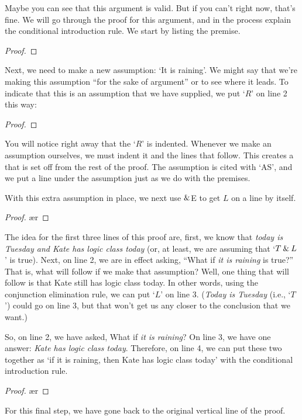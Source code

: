 Maybe you can see that this argument is valid. But if you can't right now, that's fine. We will go through the proof for this argument, and in the process explain the conditional introduction rule. We start by listing the premise.
	\begin{proof}
		 \pr{}
	\end{proof}
Next, we need to make a new assumption: `It is raining'. We might say that we're making this assumption ``for the sake of argument'' or to see where it leads. To indicate that this is an assumption that we have supplied, we put `$R$' on line 2 this way:
	\begin{proof}
		 \pr{}
		\open
			 \as{}
	\end{proof}
You will notice right away that the `$R$' is indented. Whenever we make an assumption ourselves, we must indent it and the lines that follow. This creates a  that is set off from the rest of the proof. The assumption is cited with `AS', and we put a line under the assumption just as we do with the premises.

With this extra assumption in place, we next use $\mathbin{\&}$E to get $L$ on a line by itself.
	\begin{proof}
		 \pr{}
		\open
			 \as{}
			\ae{r}
	\end{proof}
The idea for the first three lines of this proof are, first, we know that \textit{today is Tuesday and Kate has logic class today} (or, at least, we are assuming that `$ T \mathbin{\&} L$' is true). Next, on line 2, we are in effect asking, ``What if \textit{it is raining} is true?'' That is, what will follow if we make that assumption? Well, one thing that will follow is that Kate still has logic class today. 
In other words, using the conjunction elimination rule, we can put `$L$' on line 3. (\textit{Today is Tuesday} (i.e., `$T$') could go on line 3, but that won't get us any closer to the conclusion that we want.)

So, on line 2, we have asked, What if \textit{it is raining}? On line 3, we have one answer: \textit{Kate has logic class today}. Therefore, on line 4, we can put these two together as `if it is raining, then Kate has logic class today' with the conditional introduction rule.
	\begin{proof}
		 \pr{}
		\open
			 \as{}
			\ae{r}
			\close
	\end{proof}
For this final step, we have gone back to the original vertical line of the proof. 


